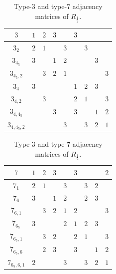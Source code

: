 \documentclass{amsart}
\theoremstyle{definition}
\theoremstyle{remark}
\begin{document}
\begin{table}
\begin{tabular}{|c||c|c|c|c|c|c|c|c|}
 \hhline{|=#=|=|=|=|=|=|=|=|}
$3$ & $1$ & $2$ & $3$ &  & $3$ &  &  & \\ \hline
$3_2$ & $2$ & $1$ &  & $3$ &  & $3$ &  & \\ \hline
$3_{4_5}$ & $3$ &  & $1$ & $2$ &  &  & $3$ & \\ \hline
$3_{4_5,2}$ &  & $3$ & $2$ & $1$ &  &  &  & $3$ \\ \hline
$3_{4}$ & $3$ &  &  &  & $1$ & $2$ & $3$ & \\ \hline
$3_{4,2}$ &  & $3$ &  &  & $2$ & $1$ &  & $3$ \\ \hline
$3_{4,4_5}$ &  &  & $3$ &  & $3$ &  & $1$ & $2$ \\ \hline
$3_{4,4_5,2}$ &  &  &  & $3$ &  & $3$ & $2$ & $1$\\ \hline
\end{tabular} \hspace{20pt}
\begin{tabular}{|c||c|c|c|c|c|c|c|c|}
 \hhline{|=#=|=|=|=|=|=|=|=|}
$7$ & $1$ & $2$ & $3$ &  & $3$ &  &  & $2$ \\ \hline
$7_1$ & $2$ & $1$ &  & $3$ &  & $3$ & $2$ & \\ \hline
$7_{6}$ & $3$ &  & $1$ & $2$ &  & $2$ & $3$ & \\ \hline
$7_{6,1}$ &  & $3$ & $2$ & $1$ & $2$ &  &  & $3$ \\ \hline
$7_{6_5}$ & $3$ &  &  & $2$ & $1$ & $2$ & $3$ & \\ \hline
$7_{6_5,1}$ &  & $3$ & $2$ &  & $2$ & $1$ &  & $3$ \\ \hline
$7_{6_5,6}$ &  & $2$ & $3$ &  & $3$ &  & $1$ & $2$ \\ \hline
$7_{6_5,6,1}$ & $2$ &  &  & $3$ &  & $3$ & $2$ & $1$\\ \hline
\end{tabular}
\caption{Type-$3$ and type-$7$ adjacency matrices of $R_{\frac{1}{2}}$.}\label{tr2}
\end{table}
\end{document}
